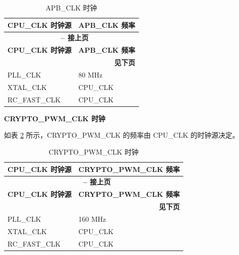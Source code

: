 \documentclass[main\_\_CN.tex]{subfiles}
\begin{document}
 \begin{longtable}[c]{ |p{5cm}|p{5cm}| }
      \caption{APB\_CLK 时钟}
    \label{tab:resclk-apb-clk-freq} \\\hline
        \rowcolor{lightgray}
            \textbf{CPU\_CLK 时钟源} & \textbf{APB\_CLK 频率} \\\hline
        \endfirsthead

        \multicolumn{2}{c}{\bfseries \tablename\ \thetable{} -- 接上页}\\\hline
        \rowcolor{lightgray}
        \textbf{CPU\_CLK 时钟源} & \textbf{APB\_CLK 频率} \\\hline
        \endhead
        \multicolumn{2}{r}{\textbf{见下页}} \\
        \endfoot
        \endlastfoot
        \hline

        PLL\_CLK & 80 MHz \\
        \hline
        XTAL\_CLK & CPU\_CLK \\
        \hline
        RC\_FAST\_CLK & CPU\_CLK \\
        \hline
\end{longtable}

\textbf{CRYPTO\_PWM\_CLK 时钟}

如表 \ref{tab:resclk-crypto-clk-freq} 所示，CRYPTO\_PWM\_CLK 的频率由 CPU\_CLK 的时钟源决定。

 \begin{longtable}[c]{ |p{5cm}|p{5cm}| }
      \caption{CRYPTO\_PWM\_CLK 时钟}
    \label{tab:resclk-crypto-clk-freq} \\
        \hline
        \rowcolor{lightgray}
        \textbf{CPU\_CLK 时钟源} & \textbf{CRYPTO\_PWM\_CLK 频率} \\
        \hline
        \endfirsthead

        \multicolumn{2}{c}{\bfseries \tablename\ \thetable{} -- 接上页}\\\hline
        \rowcolor{lightgray}
        \textbf{CPU\_CLK 时钟源} & \textbf{CRYPTO\_PWM\_CLK 频率} \\
        \hline
        \endhead

        \multicolumn{2}{r}{\textbf{见下页}} \\
        \endfoot
        \endlastfoot
        \hline
        PLL\_CLK & 160 MHz \\
        \hline
        XTAL\_CLK & CPU\_CLK \\
        \hline
        RC\_FAST\_CLK & CPU\_CLK \\
        \hline
\end{longtable}
\end{document}
